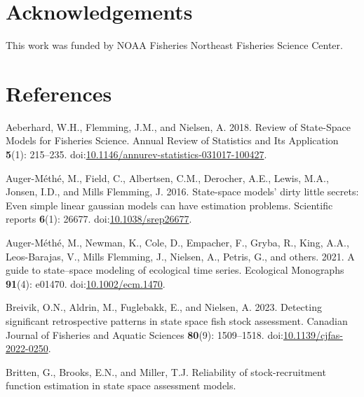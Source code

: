 \documentclass[
  12pt,
]{article}
\newlength{\cslhangindent}
\newlength{\cslentryspacingunit} %
\newenvironment{CSLReferences}[2] %
 {%
  \setlength{\parindent}{0pt}
  \ifodd #1
  \let\oldpar\par
  \def\par{\hangindent=\cslhangindent\oldpar}
  \fi
  \setlength{\parskip}{#2\cslentryspacingunit}
 }%
 {}
\begin{document}
\hypertarget{acknowledgements}{%
\section*{Acknowledgements}\label{acknowledgements}}

This work was funded by NOAA Fisheries Northeast Fisheries Science
Center.

\pagebreak

\hypertarget{references}{%
\section*{References}\label{references}}

\hypertarget{refs}{}
\begin{CSLReferences}{1}{0}
\leavevmode{}%
Aeberhard, W.H., Flemming, J.M., and Nielsen, A. 2018. Review of
{State}-{Space Models} for {Fisheries Science}. Annual Review of
Statistics and Its Application \textbf{5}(1): 215--235.
doi:\href{https://doi.org/10.1146/annurev-statistics-031017-100427}{10.1146/annurev-statistics-031017-100427}.

\leavevmode{}%
Auger-Méthé, M., Field, C., Albertsen, C.M., Derocher, A.E., Lewis,
M.A., Jonsen, I.D., and Mills Flemming, J. 2016. State-space models'
dirty little secrets: Even simple linear gaussian models can have
estimation problems. Scientific reports \textbf{6}(1): 26677.
doi:\href{https://doi.org/10.1038/srep26677}{10.1038/srep26677}.

\leavevmode{}%
Auger-Méthé, M., Newman, K., Cole, D., Empacher, F., Gryba, R., King,
A.A., Leos-Barajas, V., Mills Flemming, J., Nielsen, A., Petris, G., and
others. 2021. A guide to state--space modeling of ecological time
series. Ecological Monographs \textbf{91}(4): e01470.
doi:\href{https://doi.org/10.1002/ecm.1470}{10.1002/ecm.1470}.

\leavevmode{}%
Breivik, O.N., Aldrin, M., Fuglebakk, E., and Nielsen, A. 2023.
Detecting significant retrospective patterns in state space fish stock
assessment. Canadian Journal of Fisheries and Aquatic Sciences
\textbf{80}(9): 1509--1518.
doi:\href{https://doi.org/10.1139/cjfas-2022-0250}{10.1139/cjfas-2022-0250}.

\leavevmode{}%
Britten, G., Brooks, E.N., and Miller, T.J. Reliability of
stock-recruitment function estimation in state space assessment models.


\end{CSLReferences}
\end{document}
